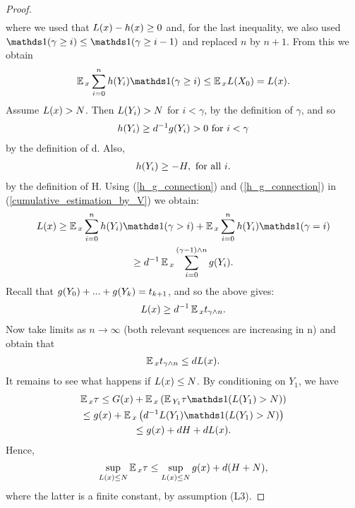 \begin{proof}
\begin{gather*}
		\end{gather*}
		where we used that $L(x) - h(x) \geq 0$ and, for the last inequality, we also used $\indicator(\gamma \geq i) \leq \indicator(\gamma \geq i - 1)$ and replaced $n$ by $n+1$. From this we obtain
		\begin{gather}
		\E{}_{x}\sum_{i=0}^{n}\hffVar(Y_{i})\indicator(\gamma \geq i) \leq \E{}_{x}\ltfVar(X_{0}) = \ltfVar(x).
		\label{cumulative_estimation_by_V}
		\end{gather}
		Assume $L(x) > N$. Then $L(Y_{i}) > N$ for $i < \gamma$, by the definition of $\gamma$, and so
		\begin{gather}
		h(Y_{i}) \geq d^{-1}g(Y_{i}) > 0 \text{ for } i < \gamma
		\label{h_g_connection}
		\end{gather}
		by the definition of d. Also,
		\begin{gather}
		h(Y_{i}) \geq -H, \text{ for all } i.
		\label{h_estimation}
		\end{gather}
		by the definition of H. Using (\ref{h_g_connection}) and (\ref{h_g_connection}) in (\ref{cumulative_estimation_by_V}) we obtain:
		\begin{gather*}
		\ltfVar(x) \geq \E{}_{x}\sum_{i=0}^{n}\hffVar(Y_{i})\indicator(\gamma > i) + \E{}_{x}\sum_{i=0}^{n}\hffVar(Y_{i})\indicator(\gamma = i) \\ \geq d^{-1}\E{}_{x}\sum_{i=0}^{(\gamma - 1) \wedge n}\gffVar(Y_{i}).
		\end{gather*}
		Recall that $g(Y_{0}) + ... + g(Y_{k}) = t_{k+1}$, and so the above gives:
		\begin{gather*}
		L(x) \geq d^{-1}\operatorname*{\mathbb{E}}{}_{x}t_{\gamma \wedge n}.
		\end{gather*}
		Now take limits as $n \xrightarrow{} \infty$ (both relevant sequences are increasing in n) and obtain that
		\begin{gather*}
		\operatorname*{\mathbb{E}}{}_{x}t_{\gamma \wedge n} \leq dL(x).
		\end{gather*}
		It remains to see what happens if $L(x) \leq N$. By conditioning on $Y_{1}$, we have
		\begin{gather*}
		\E{}_{x}\astVar \leq \gtfVar(x) + \E{}_{x}\left(\E{}_{Y_{1}}\astVar\indicator(\ltfVar(Y_{1}) > N)\right) \\ \leq \gffVar(x) + \E{}_{x}\left(d^{-1}\ltfVar(Y_{1})\indicator(\ltfVar(Y_{1}) > N)\right) \\ \leq \gffVar(x) + dH + d\ltfVar(x).
		\end{gather*}
		Hence,
		\begin{gather*}
		\sup_{L(x) \leq N}\operatorname*{\mathbb{E}}{}_{x}\tau \leq \sup_{L(x) \leq N}g(x) + d(H +N),
		\end{gather*}
		where the latter is a finite constant, by assumption (L3).
	\end{proof}
	

